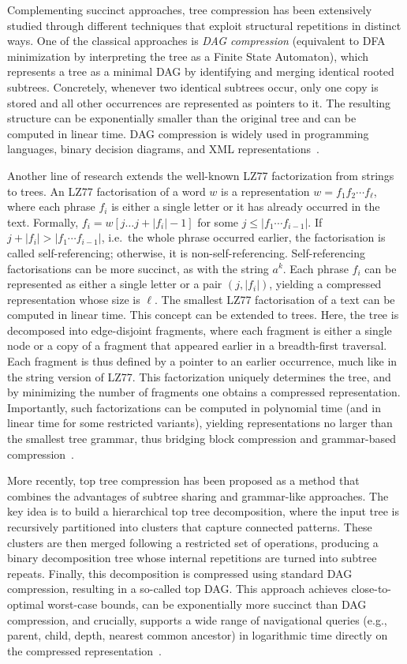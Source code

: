 Complementing succinct approaches, tree compression has been extensively studied through different techniques that exploit structural repetitions in distinct ways. One of the classical approaches is \emph{DAG compression} (equivalent to DFA minimization by interpreting the tree as a Finite State Automaton), which represents a tree as a minimal DAG by identifying and merging identical rooted subtrees. 
Concretely, whenever two identical subtrees occur, only one copy is stored and all other occurrences are represented as pointers to it. 
The resulting structure can be exponentially smaller than the original tree and can be computed in linear time. DAG compression is widely used in programming languages, binary decision diagrams, and XML representations~\cite{billeTreeCompressionTop2015}.

Another line of research extends the well-known LZ77 factorization from strings to trees. An LZ77 factorisation of a word $w$ is a representation $w = f_1f_2 \cdots f_\ell$, where each phrase $f_i$ is either a single letter or it has already occurred in the text. Formally, $f_i = w[j \dots j + |f_i| - 1]$ for some $j \le |f_1 \cdots f_{i-1}|$. If $j + |f_i| > |f_1 \cdots f_{i-1}|$, i.e.\ the whole phrase occurred earlier, the factorisation is called self-referencing; otherwise, it is non-self-referencing. Self-referencing factorisations can be more succinct, as with the string $a^k$. Each phrase $f_i$ can be represented as either a single letter or a pair $(j, |f_i|)$, yielding a compressed representation whose size is $\ell$. The smallest LZ77 factorisation of a text can be computed in linear time. This concept can be extended to trees. Here, the tree is decomposed into edge-disjoint fragments, where each fragment is either a single node or a copy of a fragment that appeared earlier in a breadth-first traversal. Each fragment is thus defined by a pointer to an earlier occurrence, much like in the string version of LZ77. This factorization uniquely determines the tree, and by minimizing the number of fragments one obtains a compressed representation. Importantly, such factorizations can be computed in polynomial time (and in linear time for some restricted variants), yielding representations no larger than the smallest tree grammar, thus bridging block compression and grammar-based compression~\cite{gawrychowskiLZ77FactorisationTrees2016}.

More recently, top tree compression has been proposed as a method that combines the advantages of subtree sharing and grammar-like approaches. The key idea is to build a hierarchical top tree decomposition, where the input tree is recursively partitioned into clusters that capture connected patterns. These clusters are then merged following a restricted set of operations, producing a binary decomposition tree whose internal repetitions are turned into subtree repeats. Finally, this decomposition is compressed using standard DAG compression, resulting in a so-called top DAG. This approach achieves close-to-optimal worst-case bounds, can be exponentially more succinct than DAG compression, and crucially, supports a wide range of navigational queries (e.g., parent, child, depth, nearest common ancestor) in logarithmic time directly on the compressed representation~\cite{billeTreeCompressionTop2015}.

